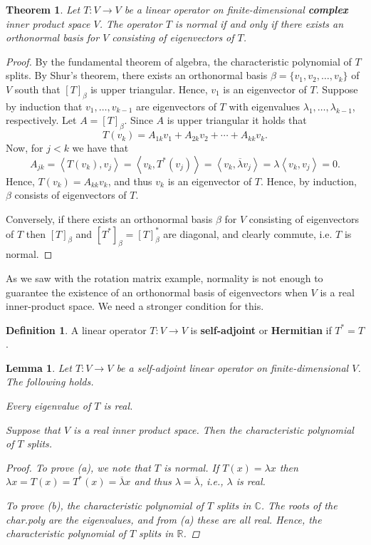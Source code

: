 \documentclass[12pt]{article}
\newcommand{\real}{\mathbb{R}}
\newcommand{\tv}{T:V\rightarrow V}
\newcommand{\indot}[1]{\left\langle #1 \right\rangle}
\newtheorem{theorem}{Theorem}[section]
\newtheorem{lemma}{Lemma}[section]
\theoremstyle{definition}
\newtheorem{definition}{Definition}[section]
\begin{document}
\begin{theorem}
Let $\tv$ be a linear operator on finite-dimensional \textbf{complex} inner product space $V$.  The operator $T$ is normal if and only if there exists an orthonormal basis for $V$ consisting of eigenvectors of $T$.
\end{theorem}
\begin{proof}
By the fundamental theorem of algebra, the characteristic polynomial of $T$ splits.  By Shur's theorem, there exists an orthonormal basis $\beta=\{v_1,v_2,\ldots,v_k\}$ of $V$ south that $[T]_\beta$ is upper triangular.  Hence, $v_1$ is an eigenvector of $T$.  Suppose by induction that $v_1,\ldots,v_{k-1}$ are eigenvectors of $T$ with eigenvalues $\lambda_1,\ldots,\lambda_{k-1}$, respectively.  Let $A=[T]_\beta$.  Since $A$ is upper triangular it holds that
\[
T(v_k) = A_{1k} v_1 + A_{2k} v_2 + \cdots + A_{kk} v_k.
\]
Now, for $j<k$ we have that
\[
A_{jk} = \indot{T(v_k),v_j} = \indot{v_k, T^*(v_j)} = \indot{v_k, \overline{\lambda} v_j} = \lambda\indot{v_k,v_j} =0.
\]
Hence, $T(v_k) = A_{kk} v_k$, and thus $v_k$ is an eigenvector of $T$.  Hence, by induction, $\beta$ consists of eigenvectors of $T$.

Conversely, if there exists an orthonormal basis $\beta$ for $V$ consisting of eigenvectors of $T$ then $[T]_\beta$ and $[T^*]_\beta = [T]_\beta^*$ are diagonal, and clearly commute, i.e. $T$ is normal.
\end{proof}

As we saw with the rotation matrix example, normality is not enough to guarantee the existence of an orthonormal basis of eigenvectors when $V$ is a real inner-product space.  We need a stronger condition for this.
\begin{definition}
A linear operator $\tv$ is \textbf{self-adjoint} or \textbf{Hermitian} if $T^*=T$.
\end{definition}    

\begin{lemma}
Let $\tv$ be a self-adjoint linear operator on finite-dimensional $V$.  The following holds.
\begin{compactenum}[(a)]
\item Every eigenvalue of $T$ is real.
\item Suppose that $V$ is a real inner product space.  Then the characteristic polynomial of $T$ splits.
\end{compactenum}
\begin{proof}
To prove (a), we note that $T$ is normal.  If $T(x)=\lambda x$ then $\lambda x = T(x) = T^*(x) = \overline{\lambda} x$ and thus $\lambda = \overline{\lambda}$, i.e., $\lambda$ is real.

To prove (b), the characteristic polynomial of $T$ splits in $\mathbb{C}$.  The roots of the char.poly are the eigenvalues, and from (a) these are all real.  Hence, the characteristic polynomial of $T$ splits in $\real$.
\end{proof}
\end{lemma}
\end{document}
